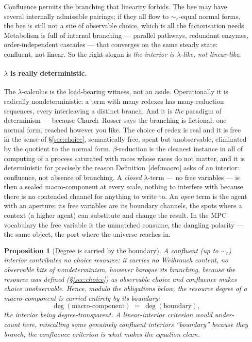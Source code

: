 \documentclass[11pt]{article}
\theoremstyle{definition}
\theoremstyle{plain}
\newtheorem{proposition}{Proposition}
\theoremstyle{remark}
\newcommand{\rbisim}{\sim_{r}}
\begin{document}
\noindent
Confluence permits the branching that linearity forbids. The bee may have several
internally admissible pairings; if they all flow to $\rbisim$-equal normal forms,
the bee is still not a site of observable choice, which is all the factorisation
needs. Metabolism is full of internal branching --- parallel pathways, redundant
enzymes, order-independent cascades --- that converges on the same steady state:
confluent, not linear. So the right slogan is \emph{the interior is
$\lambda$-like, not linear-like}.

\paragraph{$\lambda$ is really deterministic.}
The $\lambda$-calculus is the load-bearing witness, not an aside. Operationally it
is radically nondeterministic: a term with many redexes has many reduction
sequences, every interleaving a distinct branch. And it is \emph{the} paradigm of
determinism --- because Church--Rosser says the branching is fictional: one normal
form, reached however you like. The choice of redex is real and it is free in the
sense of \S\ref{sec:choice}, semantically free, spent but unobservable, eliminated
by the quotient to the normal form. $\beta$-reduction is the cleanest instance in
all of computing of a process saturated with races whose races do not matter, and
it is deterministic for precisely the reason Definition~\ref{def:macro} asks of an
interior: confluence, not absence of branching. A \emph{closed} $\lambda$-term ---
no free variables --- is then a sealed macro-component at every scale, nothing to
interfere with because there is no contended channel for anything to write to. An
\emph{open} term is the agent with an aperture: its free variables are its boundary
channels, the spots where a context (a higher agent) can substitute and change the
result. In the MPC vocabulary the free variable is the unmatched consume, the
dangling polarity --- the same object, the port where the universe reaches in.

\begin{proposition}[Degree is carried by the boundary]\label{prop:degree}
A confluent (up to $\rbisim$) interior contributes no choice resource: it carries
no Weihrauch content, no observable bits of nondeterminism, however baroque its
branching, because the resource was defined (\S\ref{sec:choice}) as observable
choice and confluence makes choice unobservable. Hence, modulo the obligations
below, the resource degree of a macro-component is carried entirely by its
boundary:
\[
\deg(\text{macro-component}) \;=\; \deg(\text{boundary}),
\]
the interior being degree-transparent. A linear-interior criterion would
under-count here, miscalling some genuinely confluent interiors ``boundary''
because they branch; the confluence criterion is what makes the equation clean.
\end{proposition}
\end{document}
